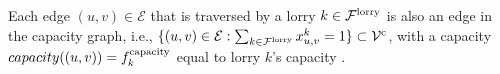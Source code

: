Each edge $ (u,v) \in \mathcal E$ that is traversed by a lorry $k \in \mathcal F^{\rm lorry}$ is also an edge in the capacity graph, i.e.,
  $ \{ (u,v) \in \mathcal E : \sum_{k \in \mathcal F^{\rm lorry}} x^k_{u,v} = 1 \} \subset \mathcal V^{\rm c} $,
with a capacity  $capacity((u,v)) = f^{\rm capacity}_k$ equal to lorry $k$'s capacity  .
\\





%




